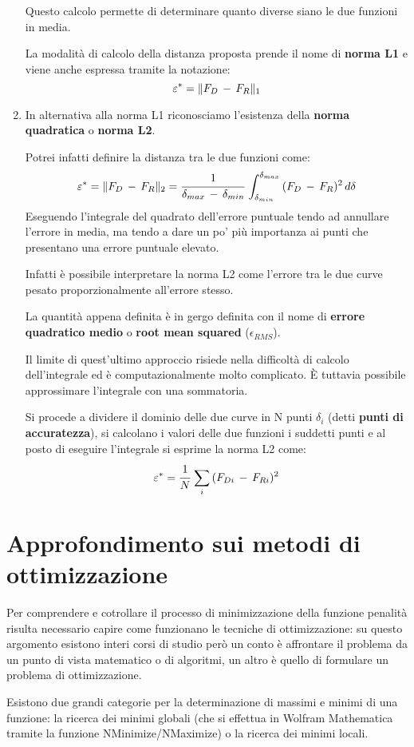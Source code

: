 \begin{enumerate}[$\rightarrow$]
Questo calcolo permette di determinare quanto diverse siano le due funzioni in media.

La modalità di calcolo della distanza proposta prende il nome di \textbf{norma L1} e viene anche espressa tramite la notazione:
\[\epsilon^* =\norma{F_D\,-\,F_R}_1\]
\item In alternativa alla norma L1 riconosciamo l'esistenza della \textbf{norma quadratica} o \textbf{norma L2}.

Potrei infatti definire la distanza tra le due funzioni come:
\[\epsilon^* = \norma{F_D\,-\,F_R}_2 = \cfrac{1}{\delta_{max}\,-\,\delta_{min}}\,\int_{\delta_{min}}^{\delta_{max}}\,(F_D\,-\,F_R)^2\,d\delta\]
Eseguendo l'integrale del quadrato dell'errore puntuale tendo ad annullare l'errore in media, ma tendo a dare un po' più importanza ai punti che presentano una errore puntuale elevato.

Infatti è possibile interpretare la norma L2 come l'errore tra le due curve pesato proporzionalmente all'errore stesso.

La quantità appena definita è in gergo definita con il nome di \textbf{errore quadratico medio} o \textbf{root mean squared} ($\epsilon_{RMS}$).

Il limite di quest'ultimo approccio risiede nella difficoltà di calcolo dell'integrale ed è computazionalmente molto complicato. È tuttavia possibile approssimare l'integrale con una sommatoria.

Si procede a dividere il dominio delle due curve in N punti $\delta_i$ (detti \textbf{punti di accuratezza}), si calcolano i valori delle due funzioni i suddetti punti e al posto di eseguire l'integrale si esprime la norma L2 come:
\[\epsilon^* = \cfrac{1}{N}\,\sum_i\,(F_{Di}\,-\,F_{Ri})^2\]
\end{enumerate}

\section{Approfondimento sui metodi di ottimizzazione}

Per comprendere e cotrollare il processo di minimizzazione della funzione penalità risulta necessario capire come funzionano le tecniche di ottimizzazione: su questo argomento esistono interi corsi di studio però un conto è affrontare il problema da un punto di vista matematico o di algoritmi, un altro è quello di formulare un problema di ottimizzazione.

Esistono due grandi categorie per la determinazione di massimi e minimi di una funzione: la ricerca dei minimi globali (che si effettua in Wolfram Mathematica tramite la funzione NMinimize/NMaximize) o la ricerca dei minimi locali.


